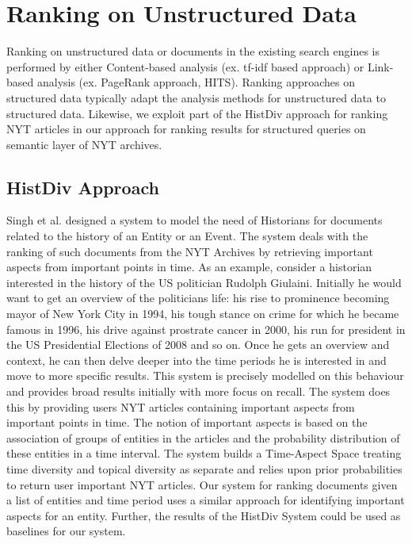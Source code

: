\documentclass{article}
\begin{document}
    \section{Ranking on Unstructured Data}
    Ranking on unstructured data or documents in the existing search engines is performed by either Content-based analysis (ex. tf-idf based approach) or Link-based analysis (ex. PageRank approach, HITS). Ranking approaches on structured data typically adapt the analysis methods for unstructured data to structured data. Likewise, we exploit part of the HistDiv approach for ranking NYT articles in our approach for ranking results for structured queries on semantic layer of NYT archives.

    \subsection{HistDiv Approach}
    Singh et al.\cite{singh16} designed a system to model the need of Historians for documents related to the history of an Entity or an Event. The system deals with the ranking of such documents from the NYT Archives by retrieving important aspects from important points in time. As an example, consider a historian interested in the history of the US politician Rudolph Giulaini. Initially he would want to get an overview of the politicians life: his rise to prominence becoming mayor of New York City in 1994, his tough stance on crime for which he became famous in 1996, his drive against prostrate cancer in 2000, his run for president in the US Presidential Elections of 2008 and so on. Once he gets an overview and context, he can then delve deeper into the time periods he is interested in and move to more specific results. This system is precisely modelled on this behaviour and provides broad results initially with more focus on recall. The system does this by providing users NYT articles containing important aspects from important points in time. The notion of important aspects is based on the association of groups of entities in the articles and the probability distribution of these entities in a time interval. The system builds a Time-Aspect Space treating time diversity and topical diversity as separate and relies upon prior probabilities to return user important NYT articles. Our system for ranking documents given a list of entities and time period uses a similar approach for identifying important aspects for an entity. Further, the results of the HistDiv System could be used as baselines for our system.
\end{document}
